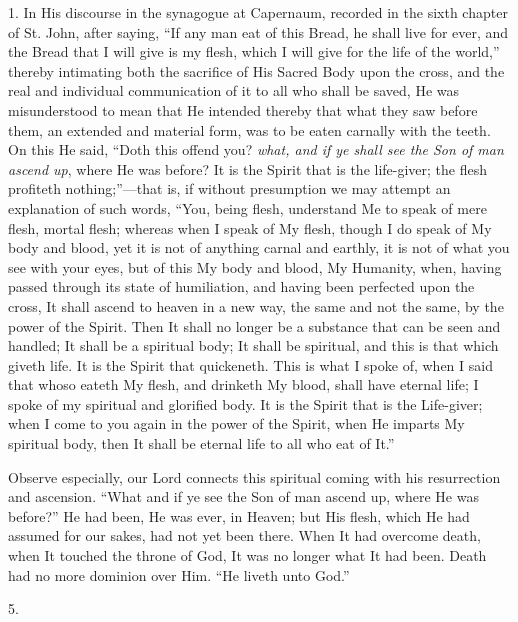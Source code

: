 1. In His discourse in the synagogue at Capernaum, recorded in the
sixth chapter of St. John, after saying, ``If any man eat of this
Bread, he shall live for ever, and the Bread that I will give is my
flesh, which I will give for the life of the world,'' thereby
intimating both the sacrifice of His Sacred Body upon the cross, and
the real and individual communication of it to all who shall be saved,
He was misunderstood to mean that He intended thereby that what they
saw before them, an extended and material form, was to be eaten
carnally with the teeth. On this He said, ``Doth this offend you? \emph{what, and if ye shall see the Son of man ascend up}, where
He was before? It is the Spirit that is the life-giver; the flesh
profiteth nothing;''—that is, if without presumption we may
attempt an explanation of such words, ``You, being flesh,
understand Me to speak of mere flesh, mortal flesh; whereas when I
speak of My flesh, though I do speak of My body and blood, yet it is
not of anything carnal and earthly, it is not of what you see with
your eyes, but of this My body and blood, My Humanity, when, having
passed through its state of humiliation, and having been perfected
upon the cross, It shall ascend to heaven in a new way, the same and
not the same, by the power of the Spirit. Then It shall no longer be a
substance that can be seen and handled; It shall be a spiritual body;
It shall be spiritual, and this is that which giveth life. It is the
Spirit that quickeneth. This is what I spoke of, when I said that
whoso eateth My flesh, and drinketh My blood, shall have eternal life;
I spoke of my spiritual and glorified body. It is the Spirit that is
the Life-giver; when I come to you again in the power of the Spirit,
when He imparts My spiritual body, then It shall be eternal life to
all who eat of It.''

Observe especially, our Lord connects this spiritual coming with
his resurrection and ascension. ``What and if ye see the Son of
man ascend up, where He was before?'' He had been, He was ever, in
Heaven; but His flesh, which He had assumed for our sakes, had not yet
been there. When It had overcome death, when It touched the throne of
God, It was no longer what It had been. Death had no more dominion
over Him. ``He liveth unto God.''

5.

